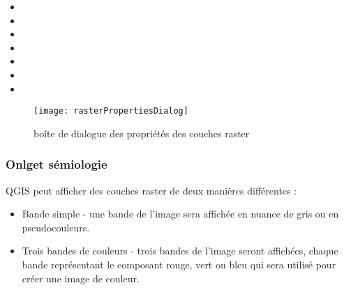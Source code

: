 \begin{itemize}
 \item {}
 \item {}
 \item {}
 \item {}
 \item {}
 \item {}
 \item {}
\end{itemize}

\begin{figure}[h]
  \begin{center}
   \caption{bo\^ite de dialogue des propri\'et\'es des couches raster
\nixcaption}\label{fig:raster_properties}\smallskip
   \texttt{[image: rasterPropertiesDialog]}
\end{center}
\end{figure}

\subsubsection{Onlget s\'emiologie}\label{label_sombology}

QGIS peut afficher des couches raster de deux mani\`eres diff\'erentes
:

\begin{itemize}
\item Bande simple - une bande de l'image sera affich\'ee en nuance de gris ou en
pseudocouleurs.
\item Trois bandes de couleurs - trois bandes de l'image seront affich\'ees,
chaque bande repr\'esentant le composant rouge, vert ou bleu qui sera utilis\'e
pour cr\'eer une image de couleur.
\end{itemize}

